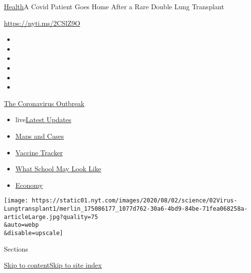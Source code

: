 \href{/section/health}{Health}\textbar{}A Covid Patient Goes Home After
a Rare Double Lung Transplant

\url{https://nyti.ms/2CSlZ9O}

\begin{itemize}
\item
\item
\item
\item
\item
\item
\end{itemize}

\href{https://www.nytimes.com/news-event/coronavirus?action=click\&pgtype=Article\&state=default\&region=TOP_BANNER\&context=storylines_menu}{The
Coronavirus Outbreak}

\begin{itemize}
\tightlist
\item
  live\href{https://www.nytimes.com/2020/08/01/world/coronavirus-covid-19.html?action=click\&pgtype=Article\&state=default\&region=TOP_BANNER\&context=storylines_menu}{Latest
  Updates}
\item
  \href{https://www.nytimes.com/interactive/2020/us/coronavirus-us-cases.html?action=click\&pgtype=Article\&state=default\&region=TOP_BANNER\&context=storylines_menu}{Maps
  and Cases}
\item
  \href{https://www.nytimes.com/interactive/2020/science/coronavirus-vaccine-tracker.html?action=click\&pgtype=Article\&state=default\&region=TOP_BANNER\&context=storylines_menu}{Vaccine
  Tracker}
\item
  \href{https://www.nytimes.com/interactive/2020/07/29/us/schools-reopening-coronavirus.html?action=click\&pgtype=Article\&state=default\&region=TOP_BANNER\&context=storylines_menu}{What
  School May Look Like}
\item
  \href{https://www.nytimes.com/live/2020/07/31/business/stock-market-today-coronavirus?action=click\&pgtype=Article\&state=default\&region=TOP_BANNER\&context=storylines_menu}{Economy}
\end{itemize}

\texttt{[image: https://static01.nyt.com/images/2020/08/02/science/02Virus-Lungtransplant1/merlin\_175086177\_1077d762-30a6-4bd9-84be-71fea068258a-articleLarge.jpg?quality=75\\\&auto=webp\\\&disable=upscale]}

Sections

\protect\hyperlink{site-content}{Skip to
content}\protect\hyperlink{site-index}{Skip to site index}

